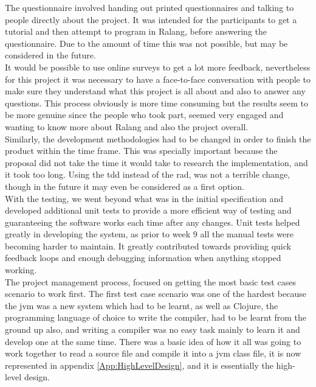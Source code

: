 \documentclass[a4paper]{article}
\begin{document}
	The questionnaire involved handing out printed questionnaires and talking to people directly about the project. It was intended for the participants to get a tutorial and then attempt to program in Ralang, before answering the questionnaire. Due to the amount of time this was not possible, but may be considered in the future.\\
	
	It would be possible to use online surveys to get a lot more feedback, nevertheless for this project it was necessary to have a face-to-face conversation with people to make sure they understand what this project is all about and also to answer any questions. This process obviously is more time consuming but the results seem to be more genuine since the people who took part, seemed very engaged and wanting to know more about Ralang and also the project overall.\\
	
	Similarly, the development methodologies had to be changed in order to finish the product within the time frame. This was specially important because the proposal did not take the time it would take to research the implementation, and it took too long. Using the \ac{tdd} instead of the \ac{rad}, was not a terrible change, though in the future it may even be considered as a first option.\\
	
	With the testing, we went beyond what was in the initial specification and developed additional unit tests to provide a more efficient way of testing and guaranteeing the software works each time after any changes. Unit tests helped greatly in developing the system, as prior to week 9 all the manual tests were becoming harder to maintain. It greatly contributed towards providing quick feedback loops and enough debugging information when anything stopped working.\\
	
	The project management process, focused on getting the most basic test cases scenario to work first. The first test case scenario was one of the hardest because the \ac{jvm} was a new system which had to be learnt, as well as Clojure, the programming language of choice to write the compiler, had to be learnt from the ground up also, and writing a compiler was no easy task mainly to learn it and develop one at the same time. There was a basic idea of how it all was going to work together to read a source file and compile it into a \ac{jvm} class file, it is now represented in appendix \ref{App:HighLevelDesign}, and it is essentially the high-level design.\\
	
\end{document}
